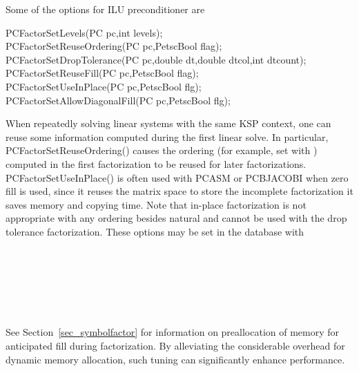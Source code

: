 Some of the options for ILU preconditioner are
\begin{tabbing}
  PCFactorSetLevels(PC pc,int levels);\\
  PCFactorSetReuseOrdering(PC pc,PetscBool  flag);\\
  PCFactorSetDropTolerance(PC pc,double dt,double dtcol,int dtcount);\\
  PCFactorSetReuseFill(PC pc,PetscBool  flag);\\
  PCFactorSetUseInPlace(PC pc,PetscBool flg); \\
  PCFactorSetAllowDiagonalFill(PC pc,PetscBool flg);
\end{tabbing}

When repeatedly solving linear systems with the same KSP
context, one can reuse some information  computed
during the first linear solve.
In particular, PCFactorSetReuseOrdering() causes the ordering  (for example, set with
 ) computed in the first factorization to be reused
for later factorizations. 
PCFactorSetUseInPlace() is often used with
PCASM or PCBJACOBI when zero fill is used, since it reuses the
matrix space to store the incomplete factorization it saves memory and
copying time. Note that in-place factorization is not appropriate with
any ordering besides natural and cannot be used with the drop tolerance
factorization. These options may be set in the database with
\begin{tabbing}
   \\
   \\
   \\
   \\
   \\
\end{tabbing}
 
 

See Section~\ref{sec_symbolfactor} for information on preallocation
of memory for anticipated fill during factorization.
By alleviating the considerable overhead for dynamic memory allocation,
such tuning can significantly enhance performance.

